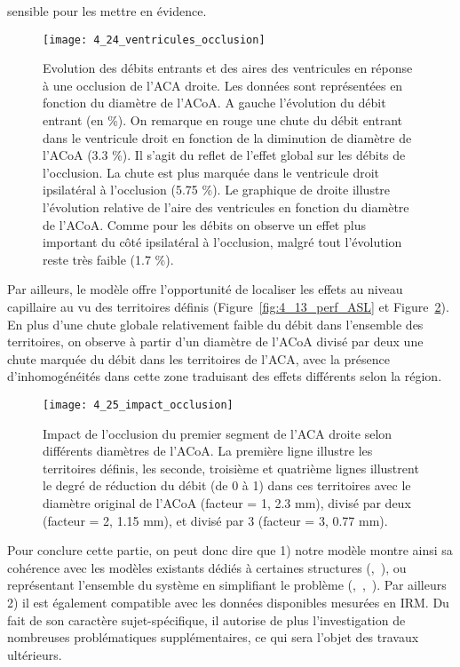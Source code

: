 sensible pour les mettre en évidence.\\
\begin{figure}[!t]
\centering
\texttt{[image: 4\_24\_ventricules\_occlusion]}
\caption{ Evolution des débits entrants et des aires des ventricules en réponse à une occlusion de l'ACA droite. Les données
sont représentées en fonction du diamètre de l'ACoA. A gauche l’évolution du débit entrant (en \%). On remarque en rouge
une chute du débit entrant dans le ventricule droit en fonction de la diminution de diamètre de l’ACoA (3.3 \%). Il s’agit du
reflet de l’effet global sur les débits de l’occlusion. La chute est plus marquée dans le ventricule droit ipsilatéral à l’occlusion
(5.75 \%). Le graphique de droite illustre l’évolution relative de l’aire des ventricules en fonction du diamètre de l’ACoA.
Comme pour les débits on observe un effet plus important du côté ipsilatéral à l’occlusion, malgré tout l’évolution reste très
faible (1.7 \%).}
\label{fig:4_24_occlusion_ventricule}	
\end{figure}
Par ailleurs, le modèle offre l’opportunité de localiser les effets au niveau capillaire au vu des
territoires définis (Figure~\ref{fig:4_13_perf_ASL} et Figure~\ref{fig:4_25_impact_occlusion}). En plus d’une chute globale relativement faible du débit
dans l’ensemble des territoires, on observe à partir d’un diamètre de l’ACoA divisé par deux une chute
marquée du débit dans les territoires de l’ACA, avec la présence d’inhomogénéités dans cette zone
traduisant des effets différents selon la région.\\
\begin{figure}[!t]
\centering
\texttt{[image: 4\_25\_impact\_occlusion]}
\caption{ Impact de l'occlusion du premier segment de l'ACA droite selon différents diamètres de l'ACoA. La première ligne
illustre les territoires définis, les seconde, troisième et quatrième lignes illustrent le degré de réduction du débit (de 0 à 1)
dans ces territoires avec le diamètre original de l’ACoA (facteur = 1, 2.3 mm), divisé par deux (facteur = 2, 1.15 mm), et divisé
par 3 (facteur = 3, 0.77 mm).}
\label{fig:4_25_impact_occlusion}	
\end{figure}
Pour conclure cette partie, on peut donc dire que 1) notre modèle montre ainsi sa cohérence
avec les modèles existants dédiés à certaines structures (\cite{Cebral2003},~\cite{Cassot1995}), ou représentant l’ensemble du
système en simplifiant le problème (\cite{Zagzoule1986},~\cite{Linninger2009},~\cite{Kim2007}). Par ailleurs 2) il est également compatible avec les
données disponibles mesurées en IRM. Du fait de son caractère sujet-spécifique, il autorise de plus
l’investigation de nombreuses problématiques supplémentaires, ce qui sera l’objet des travaux
ultérieurs.


{}
